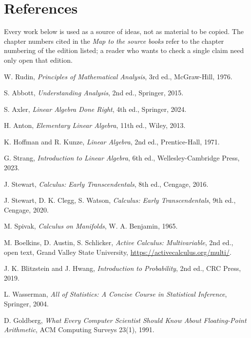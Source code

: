 \chapter*{References}

Every work below is used as a source of ideas, not as material to be copied. The chapter
numbers cited in the \emph{Map to the source books} refer to the chapter numbering of the
edition listed; a reader who wants to check a single claim need only open that edition.

\begin{sloppypar}
\begin{enumerate}[label={[\arabic*]},leftmargin=1.8em]
  \item W. Rudin, \emph{Principles of Mathematical Analysis}, 3rd ed.,
        McGraw-Hill, 1976.
  \item S. Abbott, \emph{Understanding Analysis}, 2nd ed., Springer, 2015.
  \item S. Axler, \emph{Linear Algebra Done Right}, 4th ed., Springer, 2024.
  \item H. Anton, \emph{Elementary Linear Algebra}, 11th ed., Wiley, 2013.
  \item K. Hoffman and R. Kunze, \emph{Linear Algebra}, 2nd ed.,
        Prentice-Hall, 1971.
  \item G. Strang, \emph{Introduction to Linear Algebra}, 6th ed.,
        Wellesley-Cambridge Press, 2023.
  \item J. Stewart, \emph{Calculus: Early Transcendentals}, 8th ed.,
        Cengage, 2016.
  \item J. Stewart, D. K. Clegg, S. Watson, \emph{Calculus: Early
        Transcendentals}, 9th ed., Cengage, 2020.
  \item M. Spivak, \emph{Calculus on Manifolds}, W. A. Benjamin, 1965.
  \item M. Boelkins, D. Austin, S. Schlicker, \emph{Active Calculus:
        Multivariable}, 2nd ed., open text, Grand Valley State University,
        \url{https://activecalculus.org/multi/}.
  \item J. K. Blitzstein and J. Hwang, \emph{Introduction to Probability},
        2nd ed., CRC Press, 2019.
  \item L. Wasserman, \emph{All of Statistics: A Concise Course in Statistical
        Inference}, Springer, 2004.
  \item D. Goldberg, \emph{What Every Computer Scientist Should Know About
        Floating-Point Arithmetic}, ACM Computing Surveys 23(1), 1991.

\end{enumerate}
\end{sloppypar}
